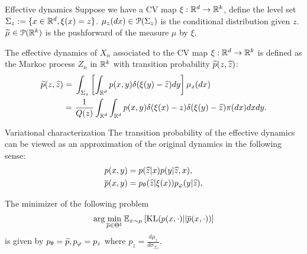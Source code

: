 \documentclass{beamer}
\begin{document}
\begin{frame}{Effective dynamics}
	Suppose we have a CV map $\xi: \mathbb{R}^d \rightarrow \mathbb{R}^k$, define the level set
	$\Sigma_z := \{ x\in\mathbb{R}^d, \xi(x) = z \}$. $\mu_z(dx) \in \mathcal{P}(\Sigma_z)$ is
	the conditional distribution given $z$. $\widetilde \mu \in \mathcal{P}(\mathbb{R}^k)$ is the
	pushforward of the measure $\mu$ by $\xi$.
	\begin{definition}
		The effective dynamics of $X_n$ associated to the CV map $\xi: \mathbb{R}^d
		\rightarrow \mathbb{R}^k$ is defined as the Markoc process $Z_n$ in $\mathbb{R}^k$
		with transition probability $\widetilde p(z, \widehat z)$:
		\begin{equation*}
			\begin{aligned}
				\widetilde p(z, \widehat z) = & \ \int_{\Sigma_z}\left[ \int_{\mathbb{R}^d} p(x, y)\delta(\xi(y) - \widehat z) dy \right] \mu_z(dx)		\\
				= & \ \frac{1}{Q(z)}\int_{\mathbb{R}^d}\int_{\mathbb{R}^d} p(x, y)\delta(\xi(x) - z) \delta(\xi(y) - \widehat z) \pi(dx) dxdy.
			\end{aligned}
		\end{equation*}
	\end{definition}
\end{frame}

\begin{frame}{Variational characterization}
	The transition probability of the effective dynamics can be viewed as an
	approximation of the original dynamics in the following sense:
	\begin{equation*}
		\begin{aligned}
			p(x, y) &= p(\widehat z | x)p(y | \widehat z, x),		\\
			\overline{p}(x, y) &= p_{\theta}(\widehat z | \xi(x))p_{\varphi}(y | \widehat z),
		\end{aligned}
	\end{equation*}
	\begin{theorem}
		The minimizer of the following problem
		\begin{equation*}
			\arg\min_{\overline{p} \in \Theta^{\xi}}\mathbb{E}_{x\sim \mu} \left[\operatorname{KL}(p(x, \cdot)||\overline{p}(x, \cdot))\right]
		\end{equation*}
		is given by $p_{\theta} = \widetilde p, p_{\varphi} = p_z$ where
		$p_z = \frac{d\mu_z}{d\sigma_{\Sigma_z}}$.
	\end{theorem}
\end{frame}
\end{document}
